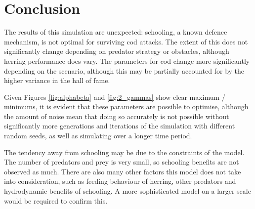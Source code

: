 \documentclass[12pt]{article}
\begin{document}
\section{Conclusion}
The results of this simulation are unexpected: schooling, a known defence mechanism, is not optimal for surviving cod attacks. The extent of this does not significantly change depending on predator strategy or obstacles, although herring performance does vary. The parameters for cod change more significantly depending on the scenario, although this may be partially accounted for by the higher variance in the hall of fame.\par
Given Figures \ref{fig:alphabeta} and \ref{fig:2_gammas} show clear maximum / minimums, it is evident that these parameters are possible to optimise, although the amount of noise mean that doing so accurately is not possible without significantly more generations and iterations of the simulation with different random seeds, as well as simulating over a longer time period.\par
The tendency away from schooling may be due to the constraints of the model. The number of predators and prey is very small, so schooling benefits are not observed as much. There are also many other factors this model does not take into consideration, such as feeding behaviour of herring, other predators and hydrodynamic benefits of schooling\supercite{shaw1978schooling}. A more sophisticated model on a larger scale would be required to confirm this.
\end{document}
